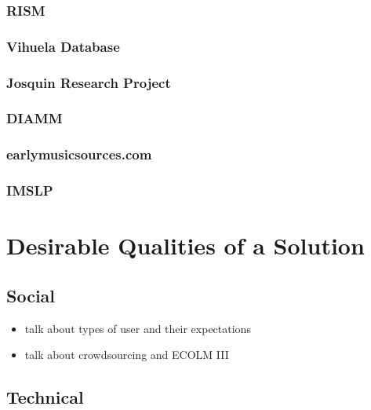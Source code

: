 \documentclass[twocolumn,10pt]{paper}
\begin{document}
\begin{sloppypar}
  \subsubsection{RISM}
  \subsubsection{Vihuela Database}
  \subsubsection{Josquin Research Project}
  \subsubsection{DIAMM}
  \subsubsection{earlymusicsources.com}
  \subsubsection{IMSLP}

  \section{Desirable Qualities of a Solution}
  \subsection{Social}

  \begin{itemize}
  \item talk about types of user and their expectations
  \item talk about crowdsourcing and ECOLM III
  \end{itemize}

  
  \subsection{Technical}


\end{sloppypar}
\end{document}
